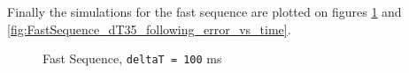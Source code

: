 \documentclass[]{scrartcl}
\begin{document}
Finally the simulations for the fast sequence are plotted on figures \ref{fig:FastSequence_dT100_following_error_vs_time} and \ref{fig:FastSequence_dT35_following_error_vs_time}.
\begin{figure}[!htp]
	\hfill
	\caption{Fast Sequence, \texttt{deltaT = 100} ms}
	\label{fig:FastSequence_dT100_following_error_vs_time}
\end{figure}
\end{document}
